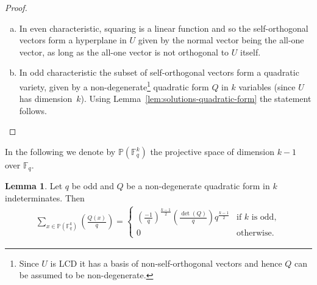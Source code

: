 \documentclass[11pt]{article}
\theoremstyle{definition}
\newtheorem{lemma}[theorem]{Lemma}
\newcommand{\F}{\mathbb{F}}
\newcommand{\Proj}{\mathbb{P}}
\newcommand{\Leg}[2]{\left(\frac{#1}{#2}\right)}                       %
\begin{document}
\begin{proof}
	\begin{enumerate}[(a)]
		\item In even characteristic, squaring is a linear function and so the self-orthogonal vectors form a hyperplane in $U$ given by the normal vector being the all-one vector, as long as the all-one vector is not orthogonal to $U$ itself.
		\item In odd characteristic the subset of self-orthogonal vectors form a quadratic variety, given by a non-degenerate\footnote{Since $U$ is LCD it has a basis of non-self-orthogonal vectors and hence $Q$ can be assumed to be non-degenerate.} quadratic form $Q$ in $k$ variables (since $U$ has dimension~$k$).
			Using Lemma~\ref{lem:solutions-quadratic-form} the statement follows.
			\qedhere{}
	\end{enumerate}
\end{proof}

In the following we denote by $\Proj(\F_q^k)$ the projective space of dimension $k-1$ over $\F_q$.

\begin{lemma}\label{lem:character-sum}
	Let $q$ be odd and $Q$ be a non-degenerate quadratic form in $k$ indeterminates.
	Then 
	\begin{align*}
		\sum_{x\in \Proj(\F_q^k)} \Leg{Q(x)}{q}
		= \begin{cases}
			{\Leg{-1}{q}}^{\frac{k - 1}{2}} \Leg{\det(Q)}{q} q^{\frac{k - 1}{2}}
			 & \text{if $k$ is odd}, \\
			 0
			 & \text{otherwise}.
		\end{cases}
	\end{align*}
\end{lemma}
\end{document}
